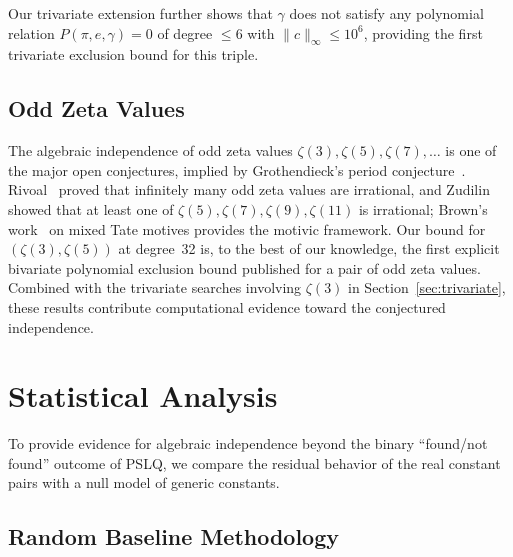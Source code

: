 \documentclass[11pt]{amsart}
\theoremstyle{remark}
\newcommand{\norm}[1]{\lVert #1 \rVert}
\begin{document}
Our trivariate extension further shows that $\gamma$ does not satisfy any
polynomial relation $P(\pi, e, \gamma) = 0$ of degree $\leq 6$ with
$\norm{c}_\infty \leq 10^6$, providing the first trivariate exclusion bound
for this triple.

\subsection{Odd Zeta Values}

The algebraic independence of odd zeta values $\zeta(3), \zeta(5), \zeta(7), \ldots$
is one of the major open conjectures, implied by Grothendieck's period
conjecture~\cite{Waldschmidt2006}. Rivoal~\cite{Rivoal2000} proved that infinitely
many odd zeta values are irrational, and Zudilin~\cite{Zudilin2001} showed that at
least one of $\zeta(5),\zeta(7),\zeta(9),\zeta(11)$ is irrational; Brown's
work~\cite{Brown2012} on mixed Tate motives provides the motivic framework.
Our bound for $(\zeta(3), \zeta(5))$ at degree~32 is, to the best of our knowledge,
the first explicit bivariate polynomial exclusion bound published for a pair of
odd zeta values. Combined with the trivariate searches involving $\zeta(3)$ in
Section~\ref{sec:trivariate}, these results contribute computational evidence
toward the conjectured independence.

\section{Statistical Analysis}\label{sec:statistics}

To provide evidence for algebraic independence beyond the binary
``found/not found'' outcome of PSLQ, we compare the residual behavior
of the real constant pairs with a null model of generic constants.

\subsection{Random Baseline Methodology}\label{ssec:baseline}
\end{document}

